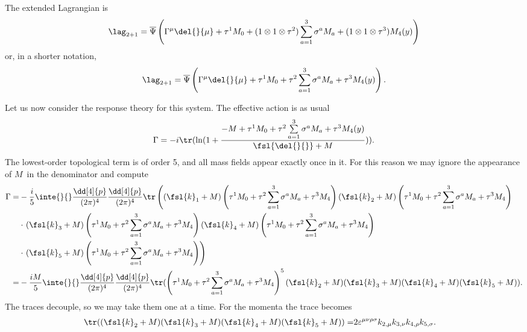 The extended Lagrangian is
\begin{align*}
	\lag_{2 + 1} = \overline{\Psi}\left(\Gamma^{\mu}\del{}{\mu} + \tau^{1}M_{0} + (1\otimes 1\otimes\tau^{2})\sum\limits_{a = 1}^{3}\sigma^{a}M_{a} + (1\otimes 1\otimes\tau^{3})M_{4}(y)\right)
\end{align*}
or, in a shorter notation,
\begin{align*}
	\lag_{2 + 1} = \overline{\Psi}\left(\Gamma^{\mu}\del{}{\mu} + \tau^{1}M_{0} + \tau^{2}\sum\limits_{a = 1}^{3}\sigma^{a}M_{a} + \tau^{3}M_{4}(y)\right).
\end{align*}

Let us now consider the response theory for this system. The effective action is as usual
\begin{align*}
	\Gamma = -i\tr(\ln(1 + \frac{-M + \tau^{1}M_{0} + \tau^{2}\sum\limits_{a = 1}^{3}\sigma^{a}M_{a} + \tau^{3}M_{4}(y)}{\fsl{\del{}{}} + M})).
\end{align*}
The lowest-order topological term is of order 5, and all mass fields appear exactly once in it. For this reason we may ignore the appearance of $M$ in the denominator and compute
\begin{align*}
	\Gamma =& -\frac{i}{5}\inte{}{}\frac{\dd[4]{p}}{(2\pi)^{4}}\frac{\dd[4]{p}}{(2\pi)^{4}}\tr\left((\fsl{k}_{1} + M)\left(\tau^{1}M_{0} + \tau^{2}\sum\limits_{a = 1}^{3}\sigma^{a}M_{a} + \tau^{3}M_{4}\right)(\fsl{k}_{2} + M)\left(\tau^{1}M_{0} + \tau^{2}\sum\limits_{a = 1}^{3}\sigma^{a}M_{a} + \tau^{3}M_{4}\right) \right. \\
	&\cdot\left. (\fsl{k}_{3} + M)\left(\tau^{1}M_{0} + \tau^{2}\sum\limits_{a = 1}^{3}\sigma^{a}M_{a} + \tau^{3}M_{4}\right)(\fsl{k}_{4} + M)\left(\tau^{1}M_{0} + \tau^{2}\sum\limits_{a = 1}^{3}\sigma^{a}M_{a} + \tau^{3}M_{4}\right) \right. \\
	&\cdot\left. (\fsl{k}_{5 } + M)\left(\tau^{1}M_{0} + \tau^{2}\sum\limits_{a = 1}^{3}\sigma^{a}M_{a} + \tau^{3}M_{4}\right)\right) \\
	=& -\frac{iM}{5}\inte{}{}\frac{\dd[4]{p}}{(2\pi)^{4}}\frac{\dd[4]{p}}{(2\pi)^{4}}\tr(\left(\tau^{1}M_{0} + \tau^{2}\sum\limits_{a = 1}^{3}\sigma^{a}M_{a} + \tau^{3}M_{4}\right)^{5}(\fsl{k}_{2} + M)(\fsl{k}_{3} + M)(\fsl{k}_{4} + M)(\fsl{k}_{5 } + M)).
\end{align*}
The traces decouple, so we may take them one at a time. For the momenta the trace becomes
\begin{align*}
	\tr((\fsl{k}_{2} + M)(\fsl{k}_{3} + M)(\fsl{k}_{4} + M)(\fsl{k}_{5 } + M)) =& 2\varepsilon^{\mu\nu\rho\sigma}k_{2, \mu}k_{3, \nu}k_{4, \rho}k_{5, \sigma}.
\end{align*}
